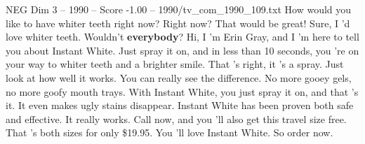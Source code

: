\begin{textsample}{NEG Dim 3 – 1990 – Score -1.00 – 1990/tv\_com\_1990\_109.txt}  \label{ex:f3_neg_021}
How would you like to have whiter teeth right now?
Right now?
That would be great!
Sure, I 'd love whiter teeth.
Wouldn't \textbf{everybody}?
Hi, I 'm Erin Gray, and I 'm here to tell you about Instant White.
Just spray it on, and in less than 10 seconds, you 're on your way to whiter teeth and a brighter smile.
That 's right, it 's a spray.
Just look at how well it works.
You can really see the difference.
No more gooey gels, no more goofy mouth trays.
With Instant White, you just spray it on, and that 's it.
It even makes ugly stains disappear.
Instant White has been proven both safe and effective.
It really works.
Call now, and you 'll also get this travel size free.
That 's both sizes for only \$19.95.
You 'll love Instant White.
So order now.

\end{textsample}
